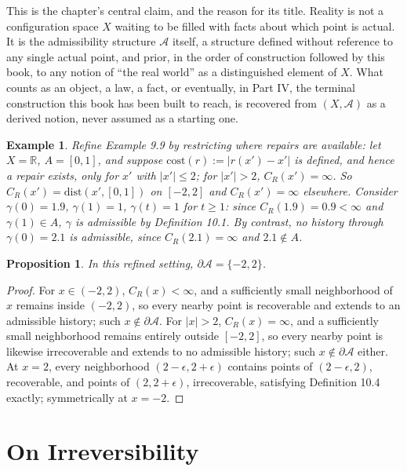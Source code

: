 \documentclass[11pt]{book}
\newtheorem{proposition}[theorem]{Proposition}
\newtheorem{example}[theorem]{Example}
\begin{document}
This is the chapter's central claim, and the reason for its title. Reality is not a configuration space $X$ waiting to be filled with facts about which point is actual. It is the admissibility structure $\mathcal A$ itself, a structure defined without reference to any single actual point, and prior, in the order of construction followed by this book, to any notion of ``the real world'' as a distinguished element of $X$. What counts as an object, a law, a fact, or eventually, in Part IV, the terminal construction this book has been built to reach, is recovered from $(X, \mathcal A)$ as a derived notion, never assumed as a starting one.

\begin{example}
Refine Example 9.9 by restricting where repairs are available: let $X = \mathbb R$, $A = [0,1]$, and suppose $\mathrm{cost}(r) := |r(x')-x'|$ is defined, and hence a repair exists, only for $x'$ with $|x'| \leq 2$; for $|x'| > 2$, $C_R(x') = \infty$. So $C_R(x') = \mathrm{dist}(x',[0,1])$ on $[-2,2]$ and $C_R(x') = \infty$ elsewhere. Consider $\gamma(0) = 1.9$, $\gamma(1) = 1$, $\gamma(t) = 1$ for $t \geq 1$: since $C_R(1.9) = 0.9 < \infty$ and $\gamma(1) \in A$, $\gamma$ is admissible by Definition 10.1. By contrast, no history through $\gamma(0) = 2.1$ is admissible, since $C_R(2.1) = \infty$ and $2.1 \notin A$.
\end{example}

\begin{proposition}
In this refined setting, $\partial \mathcal A = \{-2, 2\}$.
\end{proposition}

\begin{proof}
For $x \in (-2,2)$, $C_R(x) < \infty$, and a sufficiently small neighborhood of $x$ remains inside $(-2,2)$, so every nearby point is recoverable and extends to an admissible history; such $x \notin \partial\mathcal A$. For $|x| > 2$, $C_R(x) = \infty$, and a sufficiently small neighborhood remains entirely outside $[-2,2]$, so every nearby point is likewise irrecoverable and extends to no admissible history; such $x \notin \partial \mathcal A$ either. At $x = 2$, every neighborhood $(2-\epsilon, 2+\epsilon)$ contains points of $(2-\epsilon,2)$, recoverable, and points of $(2,2+\epsilon)$, irrecoverable, satisfying Definition 10.4 exactly; symmetrically at $x=-2$.
\end{proof}

\chapter*{On Irreversibility}
\end{document}
